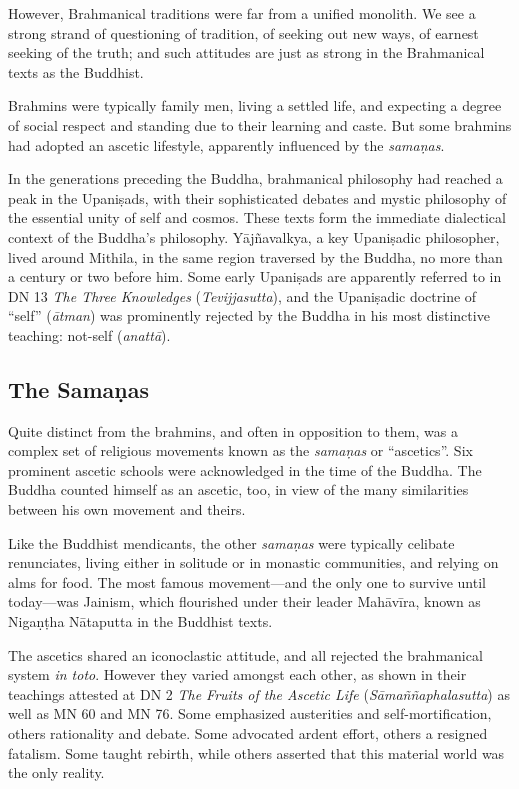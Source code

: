 \documentclass[12pt,openany]{book}%
\begin{document}
However, Brahmanical traditions were far from a unified monolith. We see a strong strand of questioning of tradition, of seeking out new ways, of earnest seeking of the truth; and such attitudes are just as strong in the Brahmanical texts as the Buddhist.

Brahmins were typically family men, living a settled life, and expecting a degree of social respect and standing due to their learning and caste. But some brahmins had adopted an ascetic lifestyle, apparently influenced by the \textit{\textsanskrit{samaṇas}}.

In the generations preceding the Buddha, brahmanical philosophy had reached a peak in the \textsanskrit{Upaniṣads}, with their sophisticated debates and mystic philosophy of the essential unity of self and cosmos. These texts form the immediate dialectical context of the Buddha’s philosophy. \textsanskrit{Yājñavalkya}, a key \textsanskrit{Upaniṣadic} philosopher, lived around Mithila, in the same region traversed by the Buddha, no more than a century or two before him. Some early \textsanskrit{Upaniṣads} are apparently referred to in DN 13 \textit{The Three Knowledges} (\textit{Tevijjasutta}), and the \textsanskrit{Upaniṣadic} doctrine of “self” (\textit{\textsanskrit{ātman}}) was prominently rejected by the Buddha in his most distinctive teaching: not-self (\textit{\textsanskrit{anattā}}).

\subsection*{The \textsanskrit{Samaṇas}}

Quite distinct from the brahmins, and often in opposition to them, was a complex set of religious movements known as the \textit{\textsanskrit{samaṇas}} or “ascetics”. Six prominent ascetic schools were acknowledged in the time of the Buddha. The Buddha counted himself as an ascetic, too, in view of the many similarities between his own movement and theirs.

Like the Buddhist mendicants, the other \textit{\textsanskrit{samaṇas}} were typically celibate renunciates, living either in solitude or in monastic communities, and relying on alms for food. The most famous movement—and the only one to survive until today—was Jainism, which flourished under their leader \textsanskrit{Mahāvīra}, known as \textsanskrit{Nigaṇṭha} \textsanskrit{Nātaputta} in the Buddhist texts.

The ascetics shared an iconoclastic attitude, and all rejected the brahmanical system \textit{in toto}. However they varied amongst each other, as shown in their teachings attested at DN 2 \textit{The Fruits of the Ascetic Life} (\textit{\textsanskrit{Sāmaññaphalasutta}}) as well as MN 60 and MN 76. Some emphasized austerities and self-mortification, others rationality and debate. Some advocated ardent effort, others a resigned fatalism. Some taught rebirth, while others asserted that this material world was the only reality.
\end{document}
